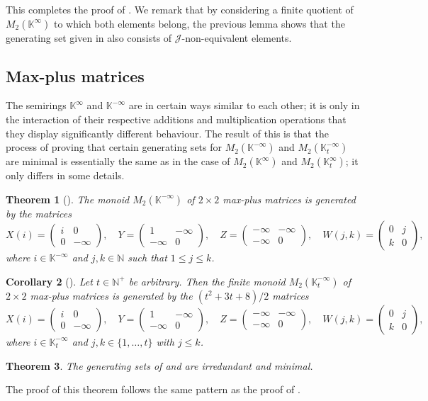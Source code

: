 \documentclass[11pt]{article}
\newtheorem{thm}{Theorem}[subsection]
\newtheorem{cor}[thm]{Corollary}
\numberwithin{equation}{section}
\newcommand{\J}{\mathscr{J}}
\newcommand{\N}{\mathbb{N}}
\newcommand{\Np}{\N^{+}}
\newcommand{\K}{\mathbb{K}}
\newcommand{\Kmin}{\K^{\infty}}
\newcommand{\Kmint}{\K^{\infty}_t}
\newcommand{\Kmax}{\K^{-\infty}}
\newcommand{\Kmaxt}{\K^{-\infty}_t}
\newcommand{\mat}[4]{\begin{pmatrix}#1&#2\\#3&#4\end{pmatrix}}
\newcommand{\COMMA}{,\quad}
\begin{document}
This completes the proof of . We remark that by
considering a finite quotient of $M_2(\Kmin)$ to which both elements belong, the
previous lemma shows that the generating set given in 
also consists of $\J$-non-equivalent elements.


\subsection{Max-plus matrices}

The semirings $\Kmin$ and $\Kmax$ are in certain ways similar to each other; it
is only in the interaction of their respective additions and multiplication
operations that they display significantly different behaviour. The result of
this is that the process of proving that certain generating sets for
$M_2(\Kmax)$ and $M_2(\Kmaxt)$ are minimal is essentially the same as in the case
of $M_2(\Kmin)$ and $M_2(\Kmint)$; it only differs in some details.

\begin{thm}[\cite{East2020aa}]
  The monoid $M_2(\Kmax)$ of $2 \times 2$ max-plus matrices is
  generated by the matrices 
  \[
    X(i) = \mat i00{-\infty} \COMMA
    Y = \mat 1{-\infty}{-\infty}0 \COMMA
    Z = \mat {-\infty}{-\infty}{-\infty}0 \COMMA
    W(j,k) = \mat 0jk0 ,
  \]
  where $i\in \Kmax$ and $j, k\in\N$ such that $1 \leq j \leq k$.
\end{thm}

\begin{cor}[\cite{East2020aa}]
  Let $t\in \Np$ be arbitrary. Then the finite monoid $M_2(\Kmaxt)$ of $2
  \times 2$ max-plus matrices is generated by the $(t^2+3t+8)/2$ matrices 
  \[
    X(i) = \mat i00{-\infty} \COMMA
  Y = \mat 1{-\infty}{-\infty}0 \COMMA
  Z = \mat {-\infty}{-\infty}{-\infty}0 \COMMA
  W(j,k) = \mat 0jk0 ,
  \]
  where $i\in\Kmaxt$ and $j,k\in\{1,\ldots,t\}$ with $j\leq k$.
\end{cor}

\begin{thm}
  The generating sets of  and
   are irredundant and minimal.
\end{thm}
The proof of this theorem follows the same pattern as the proof of
.
\end{document}
